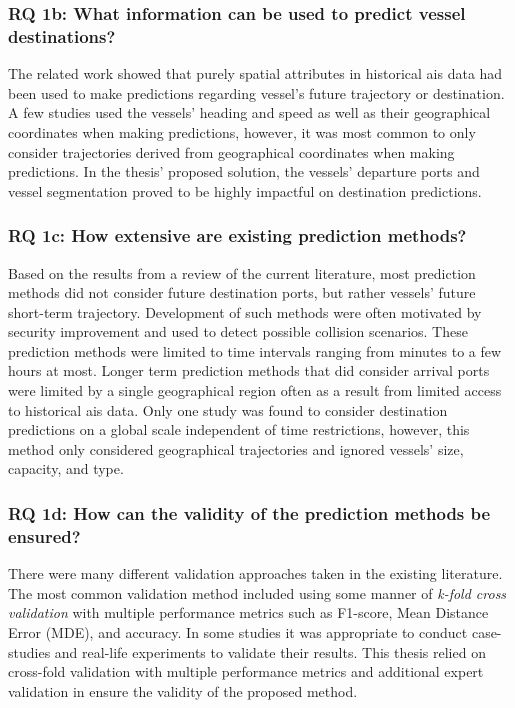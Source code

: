 \subsubsection{RQ 1b: What information can be used to predict vessel destinations?}

The related work showed that purely spatial attributes in historical \acrshort{ais} data had been used to make predictions regarding vessel's future trajectory or destination. A few studies used the vessels' heading and speed as well as their geographical coordinates when making predictions, however, it was most common to only consider trajectories derived from geographical coordinates when making predictions. In the thesis' proposed solution, the vessels' departure ports and vessel segmentation proved to be highly impactful on destination predictions.

\subsubsection{RQ 1c: How extensive are existing prediction methods?}

Based on the results from a review of the current literature, most prediction methods did not consider future destination ports, but rather vessels' future short-term trajectory. Development of such methods were often motivated by security improvement and used to detect possible collision scenarios. These prediction methods were limited to time intervals ranging from minutes to a few hours at most. Longer term prediction methods that did consider arrival ports were limited by a single geographical region often as a result from limited access to historical \acrshort{ais} data. Only one study was found to consider destination predictions on a global scale independent of time restrictions, however, this method only considered geographical trajectories and ignored vessels' size, capacity, and type.

\subsubsection{RQ 1d: How can the validity of the prediction methods be ensured?}

There were many different validation approaches taken in the existing literature. The most common validation method included using some manner of \textit{k-fold cross validation} with multiple performance metrics such as F1-score, Mean Distance Error (MDE), and accuracy. In some studies it was appropriate to conduct case-studies and real-life experiments to validate their results. This thesis relied on cross-fold validation with multiple performance metrics and additional expert validation in ensure the validity of the proposed method.

